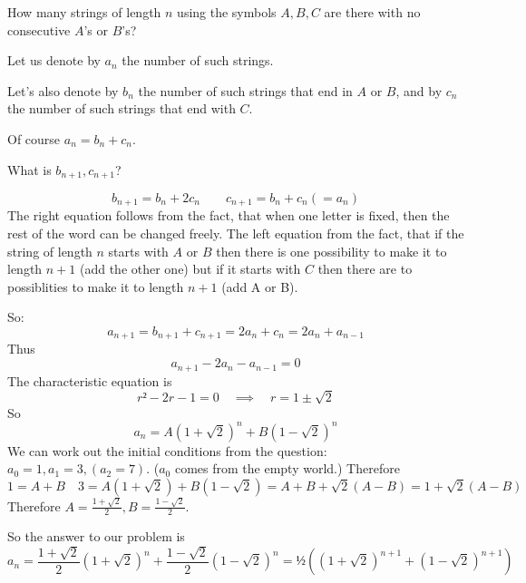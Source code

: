 \documentclass[english]{lbscript}
\begin{document}
\begin{example}{}{}
	How many strings of length \(n\) using the symbols \(A, B, C\) are there with no consecutive \(A\)'s or \(B\)'s?

	Let us denote by \(a_n\) the number of such strings.

	Let's also denote by \(b_n\) the number of such strings that end in \(A\) or \(B\), and by \(c_n\) the number of such strings that end with \(C\).

	Of course \(a_n=b_n+c_n\).

	What is \(b_{n+1}, c_{n+1}\)?


	\begin{equation}
		\label{eq:82}
		b_{n+1}= b_n + 2c_n  \quad \quad c_{n+1} = b_n + c_n (=a_n)
	\end{equation}
	The right equation follows from the fact, that when one letter is fixed, then the rest of the word can be changed freely. The left equation from the fact, that if the string of length \(n\) starts with \(A\) or \(B\) then there is one possibility to make it to length \(n+1\) (add the other one) but if it starts with \(C\) then there are to possiblities to make it to length \(n+1\) (add A or B).

	So:
	\begin{equation}
		\label{eq:88}
		a_{n+1}= b_{n+1}+c_{n+1} = 2a_n+c_n = 2a_n+a_{n-1}
	\end{equation}
	Thus
	\begin{equation}
		\label{eq:89}
		a_{n+1} - 2a_n - a_{n-1} = 0
	\end{equation}
	The characteristic equation is
	\begin{equation}
		\label{eq:90}
		r²-2r -1 = 0 \quad ⟹ \quad  r = 1±\sqrt{2}
	\end{equation}
	So
	\begin{equation}
		\label{eq:91}
		a_{n} = A(1+\sqrt{2})^{n} + B(1-\sqrt{2})^{n}
	\end{equation}
	We can work out the initial conditions from the question: \(a_0=1, a_1=3, (a_2=7)\). (\(a_0\) comes from the empty world.)
	Therefore
	\begin{equation}
		\label{eq:92}
		1=A+B\quad 3=A(1+\sqrt{2}) + B(1-\sqrt{2})= A+B + \sqrt{2}(A-B) = 1 + \sqrt{2}(A-B)
	\end{equation}
	Therefore \(A= \frac{1+\sqrt{2}}{2}, B= \frac{1-\sqrt{2}}{2}\).

	So the answer to our problem is
	\begin{equation}
		\label{eq:93}
		a_n= \frac{1+\sqrt{2}}{2}\left(1+\sqrt{2} \right)^{n} + \frac{1-\sqrt{2}}{2} \left(1-\sqrt{2} \right)^{n}= ½\left( \left(1+\sqrt{2} \right)^{n+1} + \left(1-\sqrt{2} \right)^{n+1}  \right)
	\end{equation}
\end{example}
\end{document}
